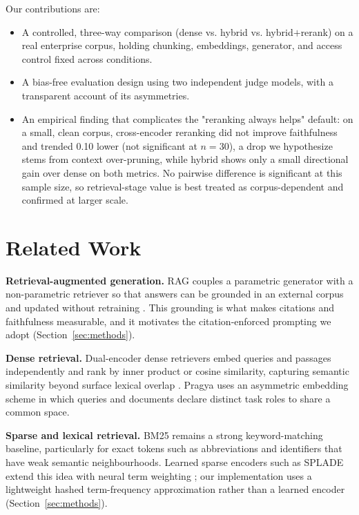 \documentclass[conference]{IEEEtran}
\begin{document}
Our contributions are:
\begin{itemize}
  \item A controlled, three-way comparison (dense vs. hybrid vs.
        hybrid$+$rerank) on a real enterprise corpus, holding chunking,
        embeddings, generator, and access control fixed across conditions.
  \item A bias-free evaluation design using two independent judge models, with
        a transparent account of its asymmetries.
  \item An empirical finding that complicates the "reranking always helps"
        default: on a small, clean corpus, cross-encoder reranking did not
        improve faithfulness and trended 0.10 lower (not significant at
        $n=30$), a drop we hypothesize stems from context over-pruning, while
        hybrid shows only a small directional gain over dense on both metrics.
        No pairwise difference is significant at this sample size, so
        retrieval-stage value is best treated as corpus-dependent and confirmed
        at larger scale.
\end{itemize}


\section{Related Work}
\textbf{Retrieval-augmented generation.} RAG couples a parametric generator with
a non-parametric retriever so that answers can be grounded in an external corpus
and updated without retraining \cite{lewis2020retrieval}.
This grounding is what makes citations and faithfulness measurable, and it
motivates the citation-enforced prompting we adopt (Section~\ref{sec:methods}).

\textbf{Dense retrieval.} Dual-encoder dense retrievers embed queries and
passages independently and rank by inner product or cosine similarity, capturing
semantic similarity beyond surface lexical overlap \cite{karpukhin2020dense}.
Pragya uses an asymmetric embedding scheme in which queries and documents declare
distinct task roles to share a common space.

\textbf{Sparse and lexical retrieval.} BM25 \cite{robertson2009probabilistic} remains a strong
keyword-matching baseline, particularly for exact tokens such as abbreviations
and identifiers that have weak semantic neighbourhoods.
Learned sparse encoders such as SPLADE extend this idea with neural term
weighting \cite{formal2021splade};
our implementation uses a lightweight hashed term-frequency approximation rather
than a learned encoder (Section~\ref{sec:methods}).
\end{document}
